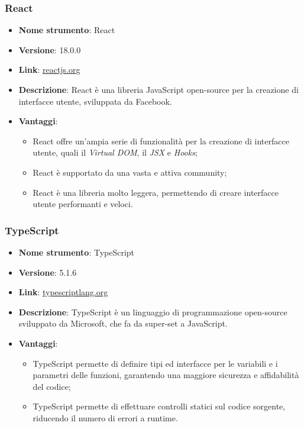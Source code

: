 \subsubsection{React}
\begin{itemize}
      \item \textbf{Nome strumento}: React
      \item \textbf{Versione}: 18.0.0
      \item \textbf{Link}: \href{https://reactjs.org/}{reactjs.org}
      \item \textbf{Descrizione}: React è una libreria JavaScript open-source per la creazione di interfacce utente, sviluppata da Facebook.
      \item \textbf{Vantaggi}:
            \begin{itemize}
                  \item React offre un'ampia serie di funzionalità per la creazione di interfacce utente, quali il \textit{Virtual DOM}, il \textit{JSX} e \textit{Hooks};
                  \item React è supportato da una vasta e attiva community;
                  \item React è una libreria molto leggera, permettendo di creare interfacce utente performanti e veloci.
            \end{itemize}
\end{itemize}

\subsubsection{TypeScript}
\begin{itemize}
      \item \textbf{Nome strumento}: TypeScript
      \item \textbf{Versione}: 5.1.6
      \item \textbf{Link}: \href{https://www.typescriptlang.org/}{typescriptlang.org}
      \item \textbf{Descrizione}: TypeScript è un linguaggio di programmazione open-source sviluppato da Microsoft, che fa da super-set a JavaScript.
      \item \textbf{Vantaggi}:
            \begin{itemize}
                  \item TypeScript permette di definire tipi ed interfacce per le variabili e i parametri delle funzioni, garantendo una maggiore sicurezza e affidabilità del codice;
                  \item TypeScript permette di effettuare controlli statici sul codice sorgente, riducendo il numero di errori a runtime.
            \end{itemize}
\end{itemize}

